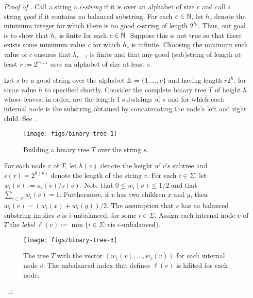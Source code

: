\documentclass{patmorin}
\begin{document}
\begin{proof}[Proof of ]
  Call a string a \emph{$c$-string} if it is over an alphabet of size $c$
  and call a string \emph{good} if it contains no balanced substring.
  For each $c\in\mathbb{N}$, let $h_c$ denote the minimum integer for which
  there is no good $c$-string of length $2^{h_c}$.  Thus, our goal is
  to show that $h_c$ is finite for each $c\in\mathbb{N}$.
  Suppose this is not true so that there exists some minimum value
  $c$ for which $h_c$ is infinite.  Choosing the minimum such value of 
  $c$ ensures that $h_{c-1}$ is finite and that any good (sub)string of
  length at least $r:=2^{h_{c-1}}$ uses an alphabet of size at least $c$.

  Let $s$ be a good string over the alphabet $\Sigma=\{1,\ldots,c\}$ and having
  length $r2^{h}$, for some value $h$ to specified shortly.   Consider
  the complete binary tree $T$ of height $h$ whose leaves, in order,
  are the length-1 substrings of $s$ and for which each internal node is
  the substring obtained by concatenating the node's left and right child.
  See .

  \begin{figure}
    \begin{center}
       \texttt{[image: figs/binary-tree-1]}
    \end{center}
    \caption{Building a binary tree $T$ over the string $s$.}
  \end{figure}

  For each node $v$ of $T$, let $h(v)$ denote the height of $v$'s subtree
  and $s(v)=2^{h(v)}$ denote the length of the string $v$. For each
  $i\in\Sigma$, let $w_i(v):=n_i(v)/s(v)$.  Note that $0\le w_i(v)\le
  1/2$ and that $\sum_{i\in\Sigma} w_i(v)=1$.  Furthermore, if $v$
  has two children $x$ and $y$, then $w_i(v) = (w_i(x)+w_i(y))/2$.
  The assumption that $s$ has no balanced substring implies $v$ is
  $i$-unbalanced, for some $i\in\Sigma$.  Assign each internal node
  $v$ of $T$ the \emph{label} $\ell(v):=\min\{i\in\Sigma: \mbox{$v$
  is $i$-unbalanced}\}$.

  \begin{figure}
    \begin{center}
       \texttt{[image: figs/binary-tree-3]} 
    \end{center}
    \caption{The tree $T$ with the vector $(w_1(v),\ldots,w_5(v))$ for each
     internal node $v$.  The unbalanced index that defines $\ell(v)$ is hilited for each node.}
  \end{figure}


\end{proof}
\end{document}
